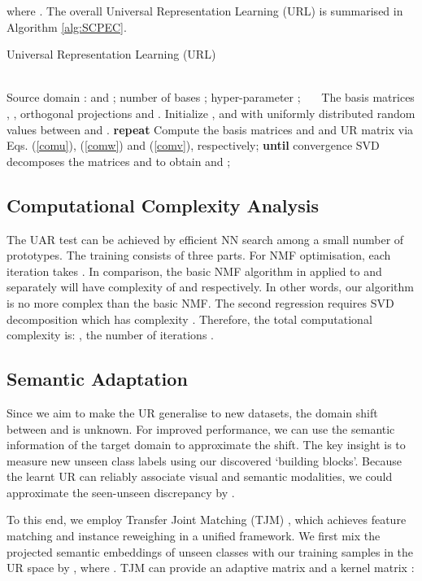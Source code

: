 \documentclass[10pt,twocolumn,letterpaper]{article}
\begin{document}
where . The overall Universal Representation Learning (URL) is summarised in Algorithm \ref{alg:SCPEC}.

\begin{algorithm}[htb] 
	\caption{Universal Representation Learning (URL)} 
	\label{alg:SCPEC}
	\begin{algorithmic}[1]
		\REQUIRE ~~\\ 
		Source domain :  and ; number of bases ; hyper-parameter ;
		\ENSURE ~~\ 
		The basis matrices , , orthogonal projections  and .
		\STATE  Initialize ,  and  with uniformly distributed random values between  and .  
		\STATE \textbf{repeat}
		\STATE  Compute the basis matrices  and  and UR matrix  via  Eqs. (\ref{comu}), (\ref{comw}) and (\ref{comv}), respectively;
		\STATE \textbf{until} convergence
		\STATE  SVD decomposes the matrices  and  to obtain  and 
		\STATE ; 
	\end{algorithmic}
\end{algorithm}

\subsection{Computational Complexity Analysis}
The UAR test can be achieved by efficient NN search among a small number of prototypes. The training consists of three parts. For NMF optimisation, each iteration takes . In comparison, the basic NMF algorithm in \cite{lee2001algorithms} applied to  and  separately will have complexity of  and  respectively. In other words, our algorithm is no more complex than the basic NMF. The second regression requires SVD decomposition which has complexity . Therefore, the total computational complexity is: , \wrt the number of iterations .

\subsection{Semantic Adaptation}
Since we aim to make the UR generalise to new datasets, the domain shift between  and  is unknown. For improved performance, we can use the semantic information of the target domain to approximate the shift. The key insight is to measure new unseen class labels using our discovered `building blocks'. Because the learnt UR can reliably associate visual and semantic modalities, \ie  we could approximate the seen-unseen discrepancy  by . 

To this end, we employ Transfer Joint Matching (TJM) \cite{TJM}, which achieves feature matching and instance reweighing in a unified framework. We first mix the projected semantic embeddings of unseen classes with our training samples in the UR space by , where . TJM can provide an adaptive matrix  and a kernel matrix :
\end{document}
